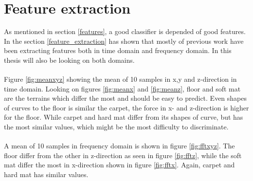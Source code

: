 \documentclass[USenglish]{ifimaster}  %
\begin{document}
	\section{Feature extraction}\label{sec:featuex}
	As mentioned in section \ref{features}, a good classifier is depended of good features. In the section \ref{feature_extraction} has shown that mostly of previous work have been extracting features both in time domain and frequency domain. In this thesis will also be looking on both domains.
	\\
	\\
	Figure \ref{fig:meanxyz} showing the mean of 10 samples in x,y and z-direction in time domain. Looking on figures \ref{fig:meanx} and \ref{fig:meanz}, floor and soft mat are the terrains which differ the most and should be easy to predict. Even shapes of curves to the floor is similar the carpet, the force in x- and z-direction is higher for the floor. While carpet and hard mat differ from its shapes of curve, but has the most similar values, which might be the most difficulty to discriminate. 
	\\
	\\
	A mean of 10 samples in frequency domain is shown in figure \ref{fig:fftxyz}. The floor differ from the other in z-direction as seen in figure \ref{fig:fftz}, while the soft mat differ the most in x-direction shown in figure \ref{fig:fftx}. Again, carpet and hard mat has similar values.
	
\end{document}
